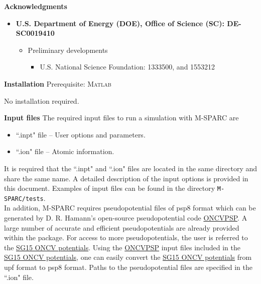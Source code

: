 \documentclass[xcolor=dvipsnames,t]{beamer}
\begin{document}
  \begin{frame}[allowframebreaks]{\textbf{Acknowledgments}} \label{Acknowledgments}
  
  \begin{itemize}
      \item \textbf{U.S. Department of Energy (DOE), Office of Science (SC): DE-SC0019410} \\

      \vspace{10pt}
      \begin{itemize}
          \item Preliminary developments
          \begin{itemize}
              \item U.S. National Science Foundation: 1333500, and 1553212
          \end{itemize}
      \end{itemize}
      
      
  \end{itemize}
  
  \end{frame}


\begin{frame}{\textbf{Installation}} \label{Installation}
Prerequisite: \textsc{Matlab}

No installation required.
\end{frame}


\begin{frame}[allowframebreaks]{\textbf{Input files}} \label{Inputfiles}
The required input files to run a simulation with M-SPARC are
\begin{itemize}
  \item ``.inpt" file -- User options and parameters.
  \item ``.ion" file -- Atomic information.
\end{itemize}
It is required that the ``.inpt" and ``.ion" files are located in the same directory and share the same name. A detailed description of the input options is provided in this document. Examples of input files can be found in the directory \texttt{M-SPARC/tests}. \\
In addition, M-SPARC requires pseudopotential files of psp8 format which can be generated by D. R. Hamann's open-source pseudopotential code \href{http://www.mat-simresearch.com/}{ONCVPSP}. A large number of accurate and efficient pseudopotentials are already provided within the package. For access to more pseudopotentials, the user is referred to the \href{http://www.quantum-simulation.org/potentials/sg15_oncv/}{SG15 ONCV potentials}. Using the \href{http://www.mat-simresearch.com/}{ONCVPSP} input files included in the \href{http://www.quantum-simulation.org/potentials/sg15_oncv/}{SG15 ONCV potentials}, one can easily convert the \href{http://www.quantum-simulation.org/potentials/sg15_oncv/}{SG15 ONCV potentials} from upf format to psp8 format. Paths to the pseudopotential files are specified in the ``.ion" file.
\end{frame}
\end{document}
